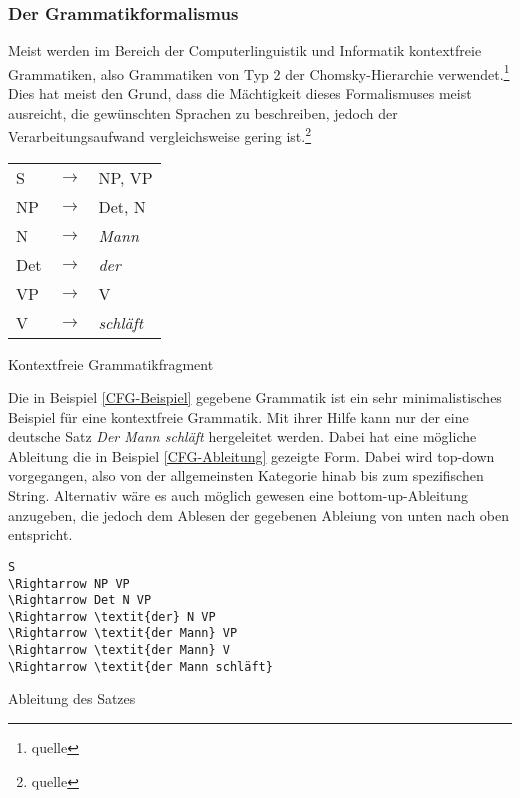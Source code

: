 \documentclass[11pt]{scrartcl}
\begin{document}
\subsubsection{Der Grammatikformalismus}
Meist werden im Bereich der Computerlinguistik und Informatik kontextfreie Grammatiken, also Grammatiken von Typ 2 der Chomsky-Hierarchie verwendet.\footnote{quelle} Dies hat meist den Grund, dass die Mächtigkeit dieses Formalismuses meist ausreicht, die gewünschten Sprachen zu beschreiben, jedoch der Verarbeitungsaufwand vergleichsweise gering ist.\footnote{quelle}
\begin{program}[h]
\begin{tabular}{lll}
S & $\longrightarrow$ & NP, VP \\
NP & $\longrightarrow$ & Det, N \\
N & $\longrightarrow$ & \textit{Mann} \\
Det & $\longrightarrow$ & \textit{der} \\
VP & $\longrightarrow$ & V \\
V  & $\longrightarrow$ & \textit{schläft} \\
\end{tabular}
\caption{Kontextfreie Grammatikfragment}
\label{CFG-Beispiel}
\end{program}
Die in Beispiel \ref{CFG-Beispiel} gegebene Grammatik ist ein sehr minimalistisches Beispiel für eine kontextfreie Grammatik. Mit ihrer Hilfe kann nur der eine deutsche Satz \textit{Der Mann schläft} hergeleitet werden. Dabei hat eine mögliche Ableitung die in Beispiel \ref{CFG-Ableitung} gezeigte Form. Dabei wird top-down vorgegangen, also von der allgemeinsten Kategorie hinab bis zum spezifischen String. Alternativ wäre es auch möglich gewesen eine bottom-up-Ableitung anzugeben, die jedoch dem Ablesen der gegebenen Ableiung von unten nach oben entspricht.
\\
\begin{program}[h]
\begin{Verbatim}[commandchars=\\\{\}]
S
\Rightarrow NP VP
\Rightarrow Det N VP
\Rightarrow \textit{der} N VP
\Rightarrow \textit{der Mann} VP
\Rightarrow \textit{der Mann} V
\Rightarrow \textit{der Mann schläft}
\end{Verbatim}
\caption{Ableitung des Satzes}
\label{CFG-Ableitung}
\end{program}
\end{document}
